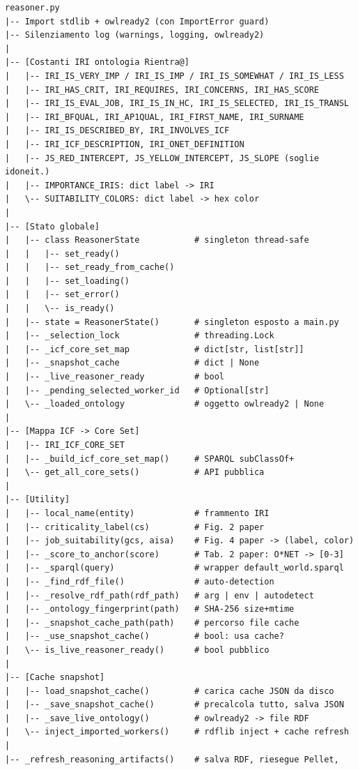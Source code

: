 \documentclass[a4paper,12pt]{article}
\begin{document}
\begin{lstlisting}[caption={Pseudo-outline di \texttt{reasoner.py}.}, numbers=none]
reasoner.py
|-- Import stdlib + owlready2 (con ImportError guard)
|-- Silenziamento log (warnings, logging, owlready2)
|
|-- [Costanti IRI ontologia Rientra@]
|   |-- IRI_IS_VERY_IMP / IRI_IS_IMP / IRI_IS_SOMEWHAT / IRI_IS_LESS
|   |-- IRI_HAS_CRIT, IRI_REQUIRES, IRI_CONCERNS, IRI_HAS_SCORE
|   |-- IRI_IS_EVAL_JOB, IRI_IS_IN_HC, IRI_IS_SELECTED, IRI_IS_TRANSL
|   |-- IRI_BFQUAL, IRI_AP1QUAL, IRI_FIRST_NAME, IRI_SURNAME
|   |-- IRI_IS_DESCRIBED_BY, IRI_INVOLVES_ICF
|   |-- IRI_ICF_DESCRIPTION, IRI_ONET_DEFINITION
|   |-- JS_RED_INTERCEPT, JS_YELLOW_INTERCEPT, JS_SLOPE (soglie idoneit.)
|   |-- IMPORTANCE_IRIS: dict label -> IRI
|   \-- SUITABILITY_COLORS: dict label -> hex color
|
|-- [Stato globale]
|   |-- class ReasonerState           # singleton thread-safe
|   |   |-- set_ready()
|   |   |-- set_ready_from_cache()
|   |   |-- set_loading()
|   |   |-- set_error()
|   |   \-- is_ready()
|   |-- state = ReasonerState()       # singleton esposto a main.py
|   |-- _selection_lock               # threading.Lock
|   |-- _icf_core_set_map             # dict[str, list[str]]
|   |-- _snapshot_cache               # dict | None
|   |-- _live_reasoner_ready          # bool
|   |-- _pending_selected_worker_id   # Optional[str]
|   \-- _loaded_ontology              # oggetto owlready2 | None
|
|-- [Mappa ICF -> Core Set]
|   |-- IRI_ICF_CORE_SET
|   |-- _build_icf_core_set_map()     # SPARQL subClassOf+
|   \-- get_all_core_sets()           # API pubblica
|
|-- [Utility]
|   |-- local_name(entity)            # frammento IRI
|   |-- criticality_label(cs)         # Fig. 2 paper
|   |-- job_suitability(gcs, aisa)    # Fig. 4 paper -> (label, color)
|   |-- _score_to_anchor(score)       # Tab. 2 paper: O*NET -> [0-3]
|   |-- _sparql(query)                # wrapper default_world.sparql
|   |-- _find_rdf_file()              # auto-detection
|   |-- _resolve_rdf_path(rdf_path)   # arg | env | autodetect
|   |-- _ontology_fingerprint(path)   # SHA-256 size+mtime
|   |-- _snapshot_cache_path(path)    # percorso file cache
|   |-- _use_snapshot_cache()         # bool: usa cache?
|   \-- is_live_reasoner_ready()      # bool pubblico
|
|-- [Cache snapshot]
|   |-- load_snapshot_cache()         # carica cache JSON da disco
|   |-- _save_snapshot_cache()        # precalcola tutto, salva JSON
|   |-- _save_live_ontology()         # owlready2 -> file RDF
|   \-- inject_imported_workers()     # rdflib inject + cache refresh
|
|-- _refresh_reasoning_artifacts()    # salva RDF, riesegue Pellet,

\end{lstlisting}
\end{document}
